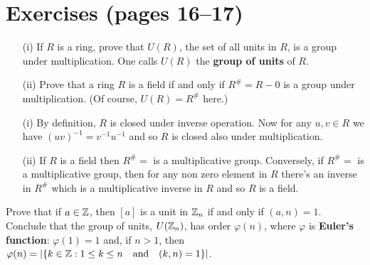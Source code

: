 
\section{Exercises (pages 16--17)}

\begin{myenumerate}

\item
\begin{excopy}
\begin{itemize}
 \item[(i)]
   If $R$ is a ring, prove that \(U(R)\), the set of all units in $R$,
   is a group under multiplication. One calls \(U(R)\) the
   \textbf{group of units} of $R$.
 \item[(ii)]
   Prove that a ring $R$ is a field if and only if \(R^{\#}=R-0\)
   is a group under multiplication. (Of course, \(U(R)=R^{\#}\) here.)
\end{itemize}
\end{excopy}

\begin{itemize}
 \item[(i)]
   By definition, $R$ is closed under inverse operation.
   Now for any \(u,v\in R\) we have \((uv)^{-1} = v^{-1}u^{-1}\) and so
   $R$ is closed also under multiplication.
 \item[(ii)]
   If $R$ is a field then \(R^{\#}=\) is a multiplicative group.
   Conversely, if \(R^{\#}=\) is a multiplicative group,
   then for any non zero element in $R$ there's an inverse
   in \(R^{\#}\) which is a multiplicative inverse in $R$ and so $R$
   is a field.
\end{itemize}


\item
\begin{excopy}
Prove that if \(a \in \mathbb{Z}\), then \([a]\) is a unit in \(\mathbb{Z}_n\)
if and only if \((a,n)=1\).
Conclude that the group of units,  \(U(\mathbb{Z}_{n})\), has order \(\varphi(n)\),
where \(\varphi\) is
\textbf{Euler's function}: \(\varphi(1)=1\) and, if \(n>1\), then
\(\varphi(n)=|\{k\in\mathbb{Z}: 1\leq k\leq n \quad\textrm{and}\quad(k,n)=1\}|\).
\end{excopy}


\end{myenumerate}
